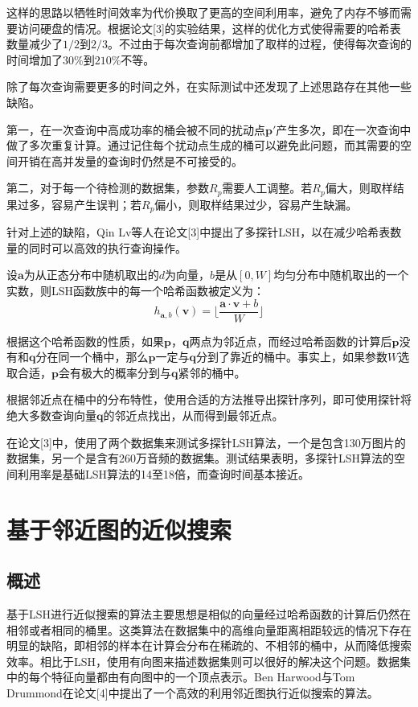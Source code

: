 这样的思路以牺牲时间效率为代价换取了更高的空间利用率，避免了内存不够而需要访问硬盘的情况。根据论文[3]的实验结果，这样的优化方式使得需要的哈希表数量减少了$1/2$到$2/3$。不过由于每次查询前都增加了取样的过程，使得每次查询的时间增加了$30\%$到$210\%$不等。

除了每次查询需要更多的时间之外，在实际测试中还发现了上述思路存在其他一些缺陷。

第一，在一次查询中高成功率的桶会被不同的扰动点$\mathbf{p'}$产生多次，即在一次查询中做了多次重复计算。通过记住每个扰动点生成的桶可以避免此问题，而其需要的空间开销在高并发量的查询时仍然是不可接受的。

第二，对于每一个待检测的数据集，参数$R_p$需要人工调整。若$R_p$偏大，则取样结果过多，容易产生误判；若$R_p$偏小，则取样结果过少，容易产生缺漏。

针对上述的缺陷，Qin Lv等人在论文[3]中提出了多探针LSH，以在减少哈希表数量的同时可以高效的执行查询操作。

设$\mathbf{a}$为从正态分布中随机取出的$d$为向量，$b$是从$[0,W]$均匀分布中随机取出的一个实数，则LSH函数族中的每一个哈希函数被定义为：
\[
h_{\mathbf{a},b}(\mathbf{v})=\Big\lfloor\frac{\mathbf{a}\cdot \mathbf{v}+b}{W} \Big\rfloor
\]

根据这个哈希函数的性质，如果$\mathbf{p}$，$\mathbf{q}$两点为邻近点，而经过哈希函数的计算后$\mathbf{p}$没有和$\mathbf{q}$分在同一个桶中，那么$\mathbf{p}$一定与$\mathbf{q}$分到了靠近的桶中。事实上，如果参数$W$选取合适，$\mathbf{p}$会有极大的概率分到与$\mathbf{q}$紧邻的桶中。

根据邻近点在桶中的分布特性，使用合适的方法推导出探针序列，即可使用探针将绝大多数查询向量$\mathbf{q}$的邻近点找出，从而得到最邻近点。

在论文[3]中，使用了两个数据集来测试多探针LSH算法，一个是包含130万图片的数据集，另一个是含有260万音频的数据集。测试结果表明，多探针LSH算法的空间利用率是基础LSH算法的14至18倍，而查询时间基本接近。


\section{基于邻近图的近似搜索}

\subsection{概述}

基于LSH进行近似搜索的算法主要思想是相似的向量经过哈希函数的计算后仍然在相邻或者相同的桶里。这类算法在数据集中的高维向量距离相距较远的情况下存在明显的缺陷，即相邻的样本在计算会分布在稀疏的、不相邻的桶中，从而降低搜索效率。相比于LSH，使用有向图来描述数据集则可以很好的解决这个问题。数据集中的每个特征向量都由有向图中的一个顶点表示。Ben Harwood与Tom Drummond在论文[4]中提出了一个高效的利用邻近图执行近似搜索的算法。


